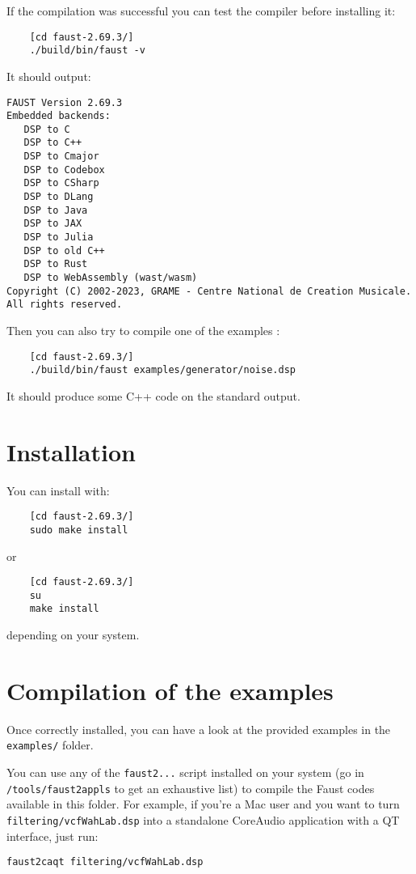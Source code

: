 If the compilation was successful you can test the compiler before installing it:
\begin{lstlisting}
	[cd faust-2.69.3/]
	./build/bin/faust -v
\end{lstlisting}
It should output:
\begin{lstlisting}
FAUST Version 2.69.3
Embedded backends: 
   DSP to C
   DSP to C++
   DSP to Cmajor
   DSP to Codebox
   DSP to CSharp
   DSP to DLang
   DSP to Java
   DSP to JAX
   DSP to Julia
   DSP to old C++
   DSP to Rust
   DSP to WebAssembly (wast/wasm)
Copyright (C) 2002-2023, GRAME - Centre National de Creation Musicale. All rights reserved. 
\end{lstlisting}

Then you can also try to compile one of the examples :
\begin{lstlisting}
	[cd faust-2.69.3/]
	./build/bin/faust examples/generator/noise.dsp
\end{lstlisting}
It should produce some C++ code on the standard output.

\section{Installation}
You can install \faust with:
\begin{lstlisting}
	[cd faust-2.69.3/]
	sudo make install
\end{lstlisting}
or
\begin{lstlisting}
	[cd faust-2.69.3/]
	su
	make install
\end{lstlisting}
depending on your system.

\section{Compilation of the examples}

Once \faust correctly installed, you can have a look at the provided examples in the \lstinline'examples/' folder. 

You can use any of the \lstinline'faust2...' script installed on your system (go in \lstinline'/tools/faust2appls' to get an exhaustive list) to compile the Faust codes available in this folder. For example, if you're a Mac user and you want to turn \lstinline'filtering/vcfWahLab.dsp' into a standalone CoreAudio application with a QT interface, just run:

\lstinline'faust2caqt filtering/vcfWahLab.dsp'


